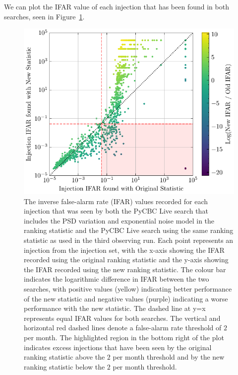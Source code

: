 We can plot the IFAR value of each injection that has been found in both searches, seen in 
Figure~\ref{5:fig:ifar-ifar-fits-psdvar-shaded}.
%
\begin{figure}
      \centering
    \includegraphics[width=1.0\textwidth]{images/5_pycbclive/plots/fits_psd_ifar_vs_ifar_shaded_region.pdf}
    \caption{The inverse false-alarm rate (IFAR) values recorded for each injection that was seen by both the PyCBC Live search that includes the PSD variation and exponential noise model in the ranking statistic and the PyCBC Live search using the same ranking statistic as used in the third observing run. Each point represents an injection from the injection set, with the x-axis showing the IFAR recorded using the original ranking statistic and the y-axis showing the IFAR recorded using the new ranking statistic. The colour bar indicates the logarithmic difference in IFAR between the two searches, with positive values (yellow) indicating better performance of the new statistic and negative values (purple) indicating a worse performance with the new statistic. The dashed line at y=x represents equal IFAR values for both searches. The vertical and horizontal red dashed lines denote a false-alarm rate threshold of $2$ per month. The highlighted region in the bottom right of the plot indicates excess injections that have been seen by the original ranking statistic above the $2$ per month threshold and by the new ranking statistic below the $2$ per month threshold.}
    \label{5:fig:ifar-ifar-fits-psdvar-shaded}
\end{figure}
